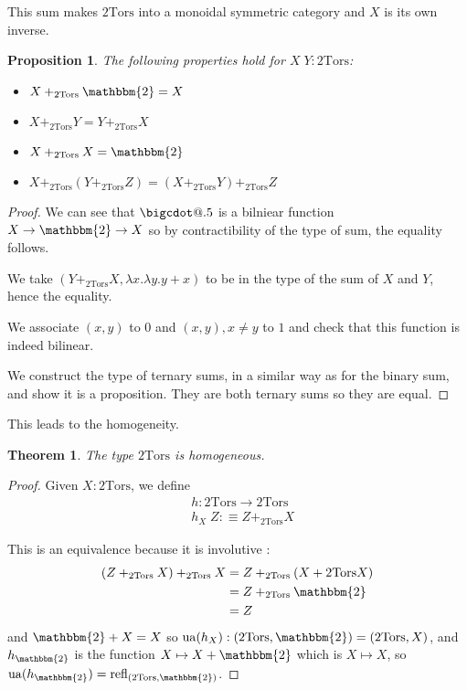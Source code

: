 \documentclass{article}
\makeatletter
\newtheorem{them}[defi]{Theorem}
\newtheorem{prop}[defi]{Proposition}
\newcommand*\bigcdot{\mathpalette\bigcdot@{.5}}
\newcommand*\bigcdot@[2]{\mathbin{\vcenter{\hbox{\scalebox{#2}{$\m@th#1\bullet$}}}}}
\newcommand{\btwo}[0]{\mathbbm{2}}
\newcommand{\twotors}[0]{2\mathrm{Tors}}
\newcommand{\refl}[0]{\mathrm{refl}}
\makeatother
\begin{document}
This sum makes $\twotors$ into a monoidal symmetric category and $X$ is its own inverse.

\begin{prop}
    The following properties hold for $X\;Y : \twotors$:
    \begin{itemize}
        \item $X+_{\twotors}\btwo = X$
        \item $X+_{\twotors} Y = Y+_{\twotors} X$
        \item $X+_{\twotors} X = \btwo$
        \item $X+_{\twotors} (Y+_{\twotors} Z) = (X+_{\twotors} Y)+_{\twotors} Z$
    \end{itemize}
\end{prop}

\begin{proof}
    We can see that $\bigcdot$ is a bilniear function $X \to \btwo\to X$ so by contractibility of the type of
    sum, the equality follows.

    We take $(Y+_{\twotors} X , \lambda x.\lambda y. y+x)$ to be in the type of the sum of $X$ and $Y$, hence
    the equality.

    We associate $(x,y)$ to $0$ and $(x,y), x\neq y$ to $1$ and check that this function is indeed bilinear.

    We construct the type of ternary sums, in a similar way as for the binary sum, and show it is a 
    proposition. They are both ternary sums so they are equal.
\end{proof}

This leads to the homogeneity.

\begin{them}
    The type $\twotors$ is homogeneous.
\end{them}

\begin{proof}
    Given $X : \twotors$, we define 
    \begin{align*}
        &h : \twotors \to \twotors\\
        &h_X\;Z :\equiv Z+_{\twotors}X
    \end{align*}

    This is an equivalence because it is involutive : 
    \begin{align*}
        (Z+_{\twotors} X)+_{\twotors} X &= Z+_{\twotors}(X+{\twotors} X)\\
        &= Z+_{\twotors}\btwo\\
        &= Z
    \end{align*}
    and $\btwo + X = X$ so $\mathrm{ua}(h_X) : (\twotors, \btwo) = (\twotors , X)$, and $h_\btwo$ is the
    function $X\mapsto X+\btwo$ which is $X\mapsto X$, so $\mathrm{ua}(h_\btwo) = \refl_{(\twotors, \btwo)}$.
\end{proof}
\end{document}
